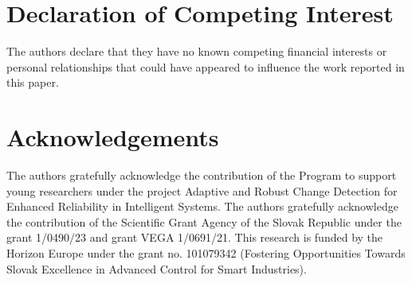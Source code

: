 \documentclass[preprint,12pt,authoryear]{elsarticle}
\begin{document}
\section*{Declaration of Competing Interest}
The authors declare that they have no known competing financial interests or personal relationships that could have appeared to influence the work reported in this paper.

\section*{Acknowledgements}
The authors gratefully acknowledge the contribution of the Program to support young researchers under the project Adaptive and Robust Change Detection for Enhanced Reliability in Intelligent Systems. The authors gratefully acknowledge the contribution of the Scientific Grant Agency of the Slovak Republic under the grant 1/0490/23 and grant VEGA 1/0691/21. This research is funded by the Horizon Europe under the grant no. 101079342 (Fostering Opportunities Towards Slovak Excellence in Advanced Control for Smart Industries).



\end{document}
